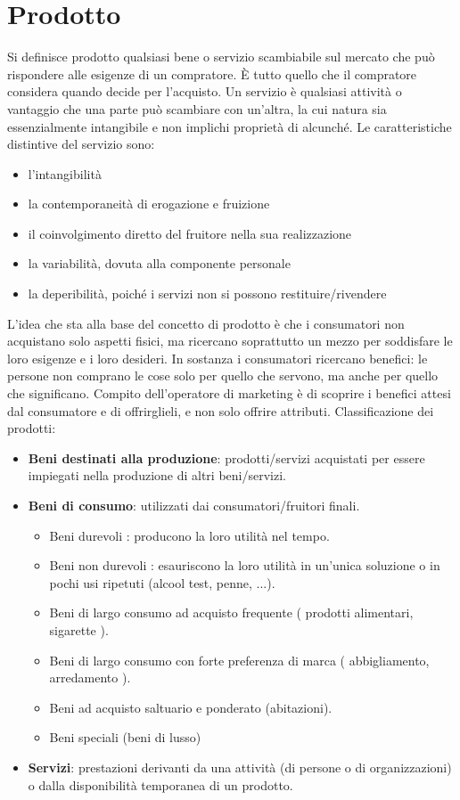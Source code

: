 \section{Prodotto}
Si definisce prodotto qualsiasi bene o servizio scambiabile sul mercato che può rispondere alle esigenze di un compratore. È tutto quello che il compratore considera quando decide per l’acquisto. \newline
Un servizio è qualsiasi attività o vantaggio che una parte può scambiare con un’altra, la cui natura sia essenzialmente intangibile e non implichi proprietà di alcunché. \newline
Le caratteristiche distintive del servizio sono:
\begin{itemize}
	\item l’intangibilità
	\item la contemporaneità di erogazione e fruizione
	\item il coinvolgimento diretto del fruitore nella sua realizzazione
	\item la variabilità, dovuta alla componente personale
	\item la deperibilità, poiché i servizi non si possono restituire/rivendere
\end{itemize}
L’idea che sta alla base del concetto di prodotto è che i consumatori non acquistano solo aspetti fisici, ma ricercano soprattutto un mezzo per soddisfare le loro esigenze e i loro desideri. In sostanza i consumatori ricercano benefici: le persone non comprano le cose solo per quello che servono, ma anche per quello che significano. \newline
Compito dell’operatore di marketing è di scoprire i benefici attesi dal consumatore e di offrirglieli, e non solo offrire attributi. \newline
Classificazione dei prodotti:
\begin{itemize}
	\item \textbf{Beni destinati alla produzione}: prodotti/servizi acquistati per essere impiegati nella produzione di altri beni/servizi.
	\item \textbf{Beni di consumo}: utilizzati dai consumatori/fruitori finali.
	\begin{itemize}
		\item Beni durevoli : producono la loro utilità nel tempo.
		\item Beni non durevoli : esauriscono la loro utilità in un’unica
		soluzione o in pochi usi ripetuti (alcool test, penne, ...).
		\item Beni di largo consumo ad acquisto frequente ( prodotti alimentari, sigarette ).
		\item Beni di largo consumo con forte preferenza di marca
		( abbigliamento, arredamento ).
		\item Beni ad acquisto saltuario e ponderato (abitazioni).
		\item Beni speciali (beni di lusso)
	\end{itemize}
    \item \textbf{Servizi}: prestazioni derivanti da una attività (di persone o di organizzazioni) o dalla disponibilità temporanea di un prodotto.
\end{itemize}
